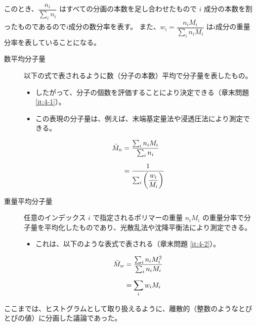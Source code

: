 \documentclass[a4paper,11pt]{jlreq}
\begin{document}
このとき、$\dfrac{n_i}{\sum_i n_i}$ はすべての分画の本数を足し合わせたもので $i$ 成分の本数を割ったものであるので$i$成分の数分率を表す。
また、$w_i=\dfrac{n_i M_i}{\sum_i n_i M_i}$ は$i$成分の重量分率を表していることになる。

\begin{description}
	\item[数平均分子量] 以下の式で表されるように数（分子の本数）平均で分子量を表したもの。
	\begin{itemize}
		\item したがって、分子の個数を評価することにより決定できる（章末問題 \ref{it:4-1}）。
		\item この表現の分子量は、例えば、末端基定量法や浸透圧法により測定できる。
	\end{itemize}
		\begin{align}
		{\bar M}_n 
			&= \dfrac{\sum_i n_i M_i}{\sum_i n_i} \notag \\[6pt]
			&= \dfrac{1}{\sum_i \left(\dfrac{w_i}{M_i} \right)}
		\label{eq:Mn}
		\end{align}

\item[重量平均分子量] 任意のインデックス $i$ で指定されるポリマーの重量 $n_i M_i$ の重量分率で分子量を平均化したものであり、光散乱法や沈降平衡法により測定できる。
		\begin{itemize}
			\item これは、以下のような表式で表される（章末問題 \ref{it:4-2}）。
		\end{itemize}
		\begin{align}
		{\bar M}_w 
			&= \dfrac{\sum_i n_i M_i^2}{\sum_i n_i M_i}\notag \\[6pt]
			&= \displaystyle \sum_i w_i M_i
		\label{eq:Mw}
		\end{align}
\end{description}

ここまでは、ヒストグラムとして取り扱えるように、離散的（整数のようなとびとびの値）に分画した議論であった。
\end{document}
